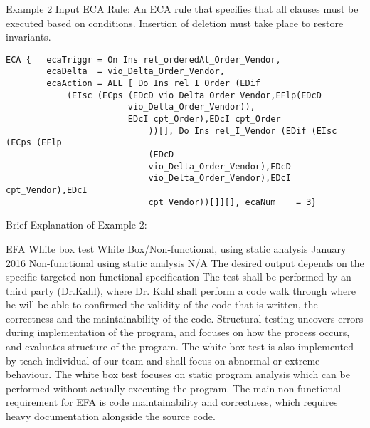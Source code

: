 \documentclass[12pt]{report}
\begin{document}
Example 2 Input ECA Rule: An ECA rule that specifies that all clauses must be 
executed based on conditions. Insertion of deletion must take place to restore 
invariants. 
\begin{verbatim}
ECA {	ecaTriggr = On Ins rel_orderedAt_Order_Vendor, 
		ecaDelta  = vio_Delta_Order_Vendor, 
		ecaAction = ALL [ Do Ins rel_I_Order (EDif 
			(EIsc (ECps	(EDcD vio_Delta_Order_Vendor,EFlp(EDcD 
						vio_Delta_Order_Vendor)),
						EDcI cpt_Order),EDcI cpt_Order
							))[], Do Ins rel_I_Vendor (EDif (EIsc (ECps (EFlp 
							(EDcD 
							vio_Delta_Order_Vendor),EDcD 
							vio_Delta_Order_Vendor),EDcI cpt_Vendor),EDcI 
							cpt_Vendor))[]][], ecaNum    = 3}
\end{verbatim}

Brief Explanation of Example 2: 

{EFA White box test} 
{White Box/Non-functional, using static analysis}  
{January 2016}
{Non-functional using static analysis}
{N/A}
{The desired output depends on the specific targeted non-functional specification}
{The test shall be performed by an third party (Dr.Kahl), where Dr. Kahl shall perform a code walk through where he will be able to confirmed the validity of the code that is written, the correctness and the maintainability of the code. Structural testing uncovers errors during implementation of the program, and focuses on how the process occurs, and evaluates structure of the program. The white box test is also implemented by teach individual of our team and shall focus on abnormal or extreme behaviour. The white box test focuses on static program analysis which can be performed without actually executing the program. The main non-functional requirement for EFA is code maintainability and correctness, which requires heavy documentation alongside the source code. }
\end{document}
